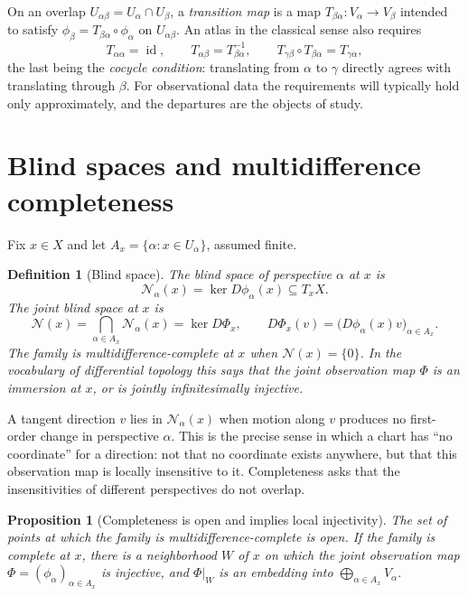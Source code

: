 \documentclass[11pt]{article}
\newtheorem{definition}{Definition}
\newtheorem{proposition}{Proposition}
\theoremstyle{remark}
\newcommand{\N}{\mathcal{N}}
\newcommand{\id}{\operatorname{id}}
\begin{document}
On an overlap $U_{\alpha\beta}=U_\alpha\cap U_\beta$, a \emph{transition map} is a map $T_{\beta\alpha}:V_\alpha\to V_\beta$ intended to satisfy $\phi_\beta=T_{\beta\alpha}\circ\phi_\alpha$ on $U_{\alpha\beta}$. An atlas in the classical sense also requires
\[
T_{\alpha\alpha}=\id,\qquad T_{\alpha\beta}=T_{\beta\alpha}^{-1},\qquad T_{\gamma\beta}\circ T_{\beta\alpha}=T_{\gamma\alpha},
\]
the last being the \emph{cocycle condition}: translating from $\alpha$ to $\gamma$ directly agrees with translating through $\beta$. For observational data the requirements will typically hold only approximately, and the departures are the objects of study.

\section{Blind spaces and multidifference completeness}

Fix $x\in X$ and let $A_x=\{\alpha:x\in U_\alpha\}$, assumed finite.

\begin{definition}[Blind space]
The \emph{blind space} of perspective $\alpha$ at $x$ is
\[
\N_\alpha(x)=\ker D\phi_\alpha(x)\subseteq T_xX .
\]
The \emph{joint blind space} at $x$ is
\[
\N(x)=\bigcap_{\alpha\in A_x}\N_\alpha(x)=\ker D\Phi_x,
\qquad
D\Phi_x(v)=\bigl(D\phi_\alpha(x)v\bigr)_{\alpha\in A_x}.
\]
The family is \emph{multidifference-complete at $x$} when $\N(x)=\{0\}$. In the vocabulary of differential topology this says that the joint observation map $\Phi$ is an immersion at $x$, or is jointly infinitesimally injective.
\end{definition}

A tangent direction $v$ lies in $\N_\alpha(x)$ when motion along $v$ produces no first-order change in perspective $\alpha$. This is the precise sense in which a chart has ``no coordinate'' for a direction: not that no coordinate exists anywhere, but that this observation map is locally insensitive to it. Completeness asks that the insensitivities of different perspectives do not overlap.

\begin{proposition}[Completeness is open and implies local injectivity]
The set of points at which the family is multidifference-complete is open. If the family is complete at $x$, there is a neighborhood $W$ of $x$ on which the joint observation map $\Phi=(\phi_\alpha)_{\alpha\in A_x}$ is injective, and $\Phi|_W$ is an embedding into $\bigoplus_{\alpha\in A_x}V_\alpha$.
\end{proposition}
\end{document}
